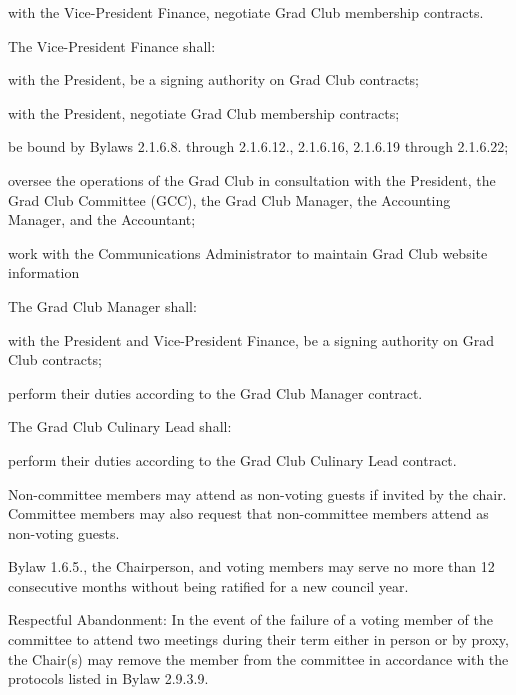 \begin{longenum}[ label*=\thesubsection.\arabic*., align=left]
\begin{longenum}[ label*=\arabic*., align=left]
\begin{longenum}[ label*=\arabic*., align=left]
		\item with the Vice-President Finance, negotiate Grad Club membership contracts.
		\end{longenum}
	\item The Vice-President Finance shall:
		\begin{longenum}[ label*=\arabic*., align=left]
		\item with the President, be a signing authority on Grad Club contracts;
		\item with the President, negotiate Grad Club membership contracts;
		\item be bound by Bylaws 2.1.6.8. through 2.1.6.12., 2.1.6.16, 2.1.6.19 through 2.1.6.22;
		\item oversee the operations of the Grad Club in consultation with the    President, the Grad Club Committee (GCC), the Grad Club Manager, the Accounting Manager, and the Accountant;
		\item work with the Communications Administrator to maintain Grad Club website information
		\end{longenum}
	\item The Grad Club Manager shall:
		\begin{longenum}[ label*=\arabic*., align=left]
		\item with the President and Vice-President Finance, be a signing authority on Grad Club contracts;
		\item perform their duties according to the Grad Club Manager contract.
		\end{longenum}
	\item The Grad Club Culinary Lead shall:
		\begin{longenum}[ label*=\arabic*., align=left]
		\item perform their duties according to the Grad Club Culinary Lead contract.
		\end{longenum}
	\end{longenum}
\item Non-committee members may attend as non-voting guests if invited by the chair. Committee members may also request that non-committee members attend as non-voting guests.
\item Bylaw 1.6.5., the Chairperson, and voting members may serve no more than 12 consecutive months without being ratified for a new council year.
\item Respectful Abandonment: In the event of the failure of a voting member of the committee to attend two meetings during their term either in person or by proxy, the Chair(s) may remove the member from the committee in accordance with the protocols listed in Bylaw 2.9.3.9.
\end{longenum}

